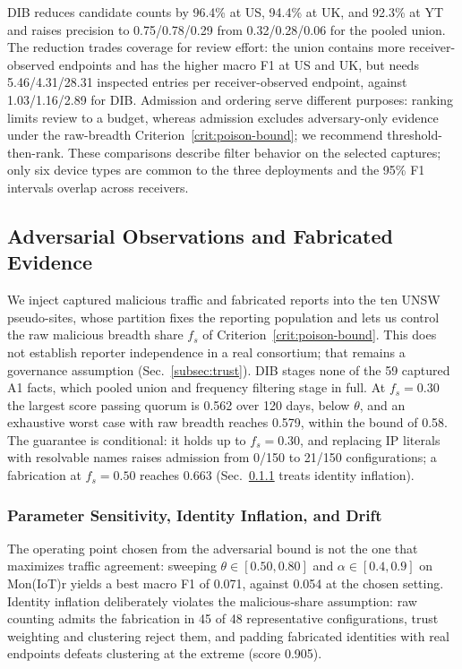 \documentclass[journal]{IEEEtran}
\theoremstyle{definition}
\begin{document}
DIB reduces candidate counts by 96.4\% at US, 94.4\% at UK, and 92.3\% at YT and raises precision to 0.75/0.78/0.29 from 0.32/0.28/0.06 for the pooled union. The reduction trades coverage for review effort: the union contains more receiver-observed endpoints and has the higher macro F1 at US and UK, but needs 5.46/4.31/28.31 inspected entries per receiver-observed endpoint, against 1.03/1.16/2.89 for DIB. Admission and ordering serve different purposes: ranking limits review to a budget, whereas admission excludes adversary-only evidence under the raw-breadth Criterion~\ref{crit:poison-bound}; we recommend threshold-then-rank. These comparisons describe filter behavior on the selected captures; only six device types are common to the three deployments and the 95\% F1 intervals overlap across receivers.

\subsection{Adversarial Observations and Fabricated Evidence}
\label{sec:security-results}
We inject captured malicious traffic and fabricated reports into the ten UNSW pseudo-sites, whose partition fixes the reporting population and lets us control the raw malicious breadth share $f_s$ of Criterion~\ref{crit:poison-bound}. This does not establish reporter independence in a real consortium; that remains a governance assumption (Sec.~\ref{subsec:trust}). DIB stages none of the 59 captured A1 facts, which pooled union and frequency filtering stage in full. At $f_s=0.30$ the largest score passing quorum is 0.562 over 120 days, below $\theta$, and an exhaustive worst case with raw breadth reaches 0.579, within the bound of 0.58. The guarantee is conditional: it holds up to $f_s=0.30$, and replacing IP literals with resolvable names raises admission from 0/150 to 21/150 configurations; a fabrication at $f_s=0.50$ reaches 0.663 (Sec.~\ref{sec:sensitivity-results} treats identity inflation). \subsubsection{Parameter Sensitivity, Identity Inflation, and Drift}
\label{sec:sensitivity-results}
The operating point chosen from the adversarial bound is not the one that maximizes traffic agreement: sweeping $\theta\in[0.50,0.80]$ and $\alpha\in[0.4,0.9]$ on Mon(IoT)r yields a best macro F1 of 0.071, against 0.054 at the chosen setting. Identity inflation deliberately violates the malicious-share assumption: raw counting admits the fabrication in 45 of 48 representative configurations, trust weighting and clustering reject them, and padding fabricated identities with real endpoints defeats clustering at the extreme (score 0.905).
\end{document}
